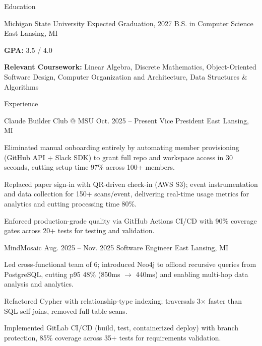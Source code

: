 \documentclass[
	11pt
]{../../../resume}
\begin{document}
	\begin{rSection}{E}{ducation}
		\begin{rSectionEntry}
			{Michigan State University}
			{Expected Graduation, 2027}
			{B.S. in Computer Science}
			{}
			{East Lansing, MI}

			\item \textbf{GPA:} 3.5 / 4.0
			\item \textbf{Relevant Coursework:} Linear Algebra, Discrete Mathematics, Object-Oriented Software Design, Computer Organization and Architecture, Data Structures \& Algorithms
		\end{rSectionEntry}
	\end{rSection}

	\begin{rSection}{E}{xperience}
		\begin{rSectionEntry}
			{Claude Builder Club @ MSU}
			{Oct. 2025 -- Present}
			{Vice President}
			{}
			{East Lansing, MI}

			\item Eliminated manual onboarding entirely by automating member provisioning (GitHub API + Slack SDK) to grant full repo and workspace access in 30 seconds, cutting setup time 97\% across 100+ members.
			\item Replaced paper sign-in with QR-driven check-in (AWS S3); event instrumentation and data collection for 150+ scans/event, delivering real-time usage metrics for analytics and cutting processing time 80\%.
			\item Enforced production-grade quality via GitHub Actions CI/CD with 90\% coverage gates across 20+ tests for testing and validation.
		\end{rSectionEntry}

		\begin{rSectionEntry}
			{MindMosaic}
			{Aug. 2025 -- Nov. 2025}
			{Software Engineer}
			{}
			{East Lansing, MI}

			\item Led cross-functional team of 6; introduced Neo4j to offload recursive queries from PostgreSQL, cutting p95 48\% (850ms $\rightarrow$ 440ms) and enabling multi-hop data analysis and analytics.
			\item Refactored Cypher with relationship-type indexing; traversals 3$\times$ faster than SQL self-joins, removed full-table scans.
			\item Implemented GitLab CI/CD (build, test, containerized deploy) with branch protection, 85\% coverage across 35+ tests for requirements validation.
		\end{rSectionEntry}
	\end{rSection}
\end{document}
